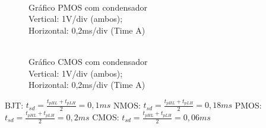 \documentclass[pdftex,12pt,a4paper]{report}
\begin{document}
\begin{figure}[!htb]
  \centerline{}
  \caption{\\Gráfico PMOS com condensador \\Vertical: 1V/div (ambos); \\Horizontal: 0,2ms/div (Time A)}\label{bjt}
\endminipage\hfill
{}
  \centerline{}
  \caption{\\Gráfico CMOS com condensador \\Vertical: 1V/div (ambos); \\Horizontal: 0,2ms/div (Time A) }\label{fig:nmos}
\endminipage\hfill
\end{figure}

\newpage
BJT:
$t_{sd} = \frac{t_{pHL}+t_{pLH}}{2} = 0,1 ms$
\newline\newline
NMOS:
$t_{sd} = \frac{t_{pHL}+t_{pLH}}{2} = 0,18 ms$
\newline\newline
PMOS:
$t_{sd} = \frac{t_{pHL}+t_{pLH}}{2} = 0,2 ms$
\newline\newline
CMOS:
$t_{sd} = \frac{t_{pHL}+t_{pLH}}{2} = 0,06 ms$
\vspace{0.4cm}
\end{document}
